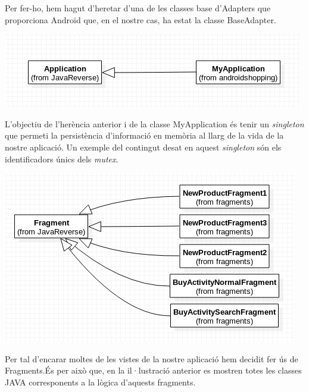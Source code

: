\documentclass{article}
\begin{document}
	Per fer-ho, hem hagut d'heretar d'una de les classes base d'Adapters que proporciona Android que, en el nostre cas, ha estat la classe BaseAdapter.
	 \begin{center}
	\includegraphics[scale=0.5]{img/3.png}
	\end{center}
	L'objectiu de l'herència anterior i de la classe MyApplication és tenir un \textit{singleton} que permeti la persistència d'informació en memòria al llarg de la vida de la nostre aplicació. Un exemple del contingut desat en aquest \textit{singleton} són els identificadors únics dels \textit{mutex}.
	\begin{center}
	\includegraphics[scale=0.5]{img/4.png}\\
\end{center}
	Per tal d'encarar moltes de les vistes de la nostre aplicació hem decidit fer ús de Fragments.És per això que, en la il·lustració anterior es mostren totes les classes JAVA corresponents a la lògica d'aquests fragments.\\
	
\end{document}
